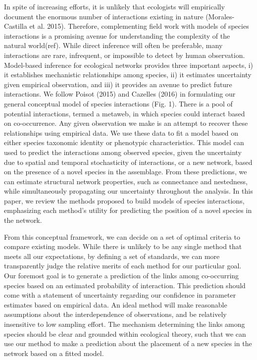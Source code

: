 In spite of increasing efforts, it is unlikely that ecologists will empirically
document the enormous number of interactions existing in nature
(Morales-Castilla et al. 2015). Therefore, complementing field work with models
of species interactions is a promising avenue for understanding the complexity
of the natural world(ref). While direct inference will often be preferable, many
interactions are rare, infrequent, or impossible to detect by human observation.
Model-based inference for ecological networks provides three important aspects,
i) it establishes mechanistic relationships among species, ii) it estimates
uncertainty given empirical observation, and iii) it provides an avenue to
predict future interactions. We follow Poisot (2015) and Cazelles (2016) in
formulating our general conceptual model of species interactions (Fig. 1). There
is a pool of potential interactions, termed a metaweb, in which species could
interact based on co-occurrence. Any given observation we make is an attempt to
recover these relationships using empirical data. We use these data to fit a
model based on either species taxonomic identity or phenotypic characteristics.
This model can used to predict the interactions among observed species, given
the uncertainty due to spatial and temporal stochasticity of interactions, or a
new network, based on the presence of a novel species in the assemblage. From
these predictions, we can estimate structural network properties, such as
connectance and nestedness, while simultaneously propagating our uncertainty
throughout the analysis. In this paper, we review the methods proposed to build
models of species interactions, emphasizing each method's utility for predicting
the position of a novel species in the network.

From this conceptual framework, we can decide on a set of optimal criteria to
compare existing models. While there is unlikely to be any single method that
meets all our expectations, by defining a set of standards, we can more
transparently judge the relative merits of each method for our particular goal.
Our foremost goal is to generate a prediction of the links among co-occurring
species based on an estimated probability of interaction. This prediction should
come with a statement of uncertainty regarding our confidence in parameter
estimates based on empirical data. An ideal method will make reasonable
assumptions about the interdependence of observations, and be relatively
insensitive to low sampling effort. The mechanism determining the links among
species should be clear and grounded within ecological theory, such that we can
use our method to make a prediction about the placement of a new species in the
network based on a fitted model.

